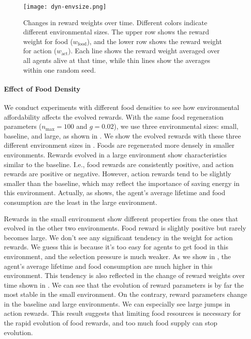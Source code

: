 \begin{figure}[ht]
  \centering
  \texttt{[image: dyn-envsize.png]}
  \caption{
    Changes in reward weights over time.
    Different colors indicate different environmental sizes.
    The upper row shows the reward weight for food ($w_{\mathrm{food}}$), and the lower row shows the reward weight for action ($w_{\mathrm{act}}$).
    Each line shows the reward weight averaged over all agents alive at that time, while thin lines show the averages within one random seed.
  }\label{figure:result-envsize-dyn}
\end{figure}

\paragraph{Effect of Food Density}
We conduct experiments with different food densities to see how environmental affordability affects the evolved rewards. With the same food regeneration parameters ($n_{\mathrm{max}} = 100$ and $g = 0.02$), we use three environmental sizes: small, baseline, and large, as shown in . We show the evolved rewards with these three different environment sizes in . Foods are regenerated more densely in smaller environments. Rewards evolved in a large environment show characteristics similar to the baseline. I.e., food rewards are consistently positive, and action rewards are positive or negative. However, action rewards tend to be slightly smaller than the baseline, which may reflect the importance of saving energy in this environment. Actually, as  shows, the agent's average lifetime and food consumption are the least in the large environment.

Rewards in the small environment show different properties from the ones that evolved in the other two environments. Food reward is slightly positive but rarely becomes large. We don't see any significant tendency in the weight for action rewards. We guess this is because it's too easy for agents to get food in this environment, and the selection pressure is much weaker. As we show in , the agent's average lifetime and food consumption are much higher in this environment. This tendency is also reflected in the change of reward weights over time shown in . We can see that the evolution of reward parameters is by far the most stable in the small environment. On the contrary, reward parameters change in the baseline and large environments. We can especially see large jumps in action rewards. This result suggests that limiting food resources is necessary for the rapid evolution of food rewards, and too much food supply can stop evolution.

